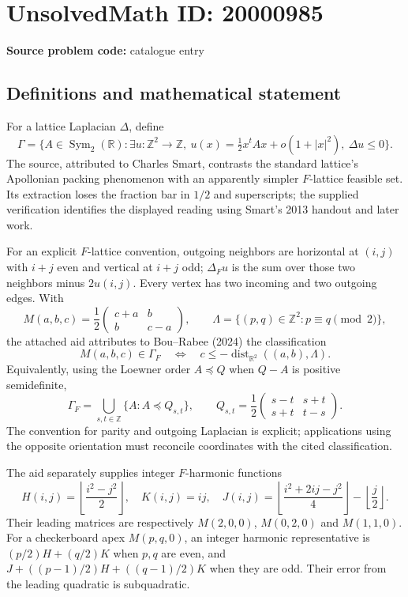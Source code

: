 \documentclass[11pt]{article}
\newcommand{\Z}{\mathbb{Z}}
\newcommand{\R}{\mathbb{R}}
\begin{document}
\section*{UnsolvedMath ID: 20000985}
\textbf{Source problem code:} catalogue entry
\subsection{Definitions and mathematical statement}
For a lattice Laplacian $\Delta$, define
\[
\Gamma=\{A\in\operatorname{Sym}_2(\R):\exists u:\Z^2\to\Z,\ u(x)=\tfrac12x^tAx+o(1+|x|^2),\ \Delta u\le0\}.
\]
The source, attributed to Charles Smart, contrasts the standard lattice's Apollonian packing phenomenon with an apparently simpler $F$-lattice feasible set. Its extraction loses the fraction bar in $1/2$ and superscripts; the supplied verification identifies the displayed reading using Smart's 2013 handout and later work.

For an explicit $F$-lattice convention, outgoing neighbors are horizontal at $(i,j)$ with $i+j$ even and vertical at $i+j$ odd; $\Delta_Fu$ is the sum over those two neighbors minus $2u(i,j)$. Every vertex has two incoming and two outgoing edges. With
\[
M(a,b,c)=\frac12\begin{pmatrix}c+a&b\\b&c-a\end{pmatrix},\qquad
\Lambda=\{(p,q)\in\Z^2:p\equiv q\pmod2\},
\]
the attached aid attributes to Bou--Rabee (2024) the classification
\[
M(a,b,c)\in\Gamma_F\quad\Longleftrightarrow\quad
c\le-\operatorname{dist}_{\R^2}((a,b),\Lambda).
\]
Equivalently, using the Loewner order $A\preceq Q$ when $Q-A$ is positive semidefinite,
\[
\Gamma_F=\bigcup_{s,t\in\Z}\{A:A\preceq Q_{s,t}\},\qquad
Q_{s,t}=\frac12\begin{pmatrix}s-t&s+t\\s+t&t-s\end{pmatrix}.
\]
The convention for parity and outgoing Laplacian is explicit; applications using the opposite orientation must reconcile coordinates with the cited classification.

The aid separately supplies integer $F$-harmonic functions
\[
H(i,j)=\left\lfloor\frac{i^2-j^2}2\right\rfloor,\quad K(i,j)=ij,\quad
J(i,j)=\left\lfloor\frac{i^2+2ij-j^2}4\right\rfloor-\left\lfloor\frac j2\right\rfloor.
\]
Their leading matrices are respectively $M(2,0,0)$, $M(0,2,0)$ and $M(1,1,0)$. For a checkerboard apex $M(p,q,0)$, an integer harmonic representative is $(p/2)H+(q/2)K$ when $p,q$ are even, and $J+((p-1)/2)H+((q-1)/2)K$ when they are odd. Their error from the leading quadratic is subquadratic.
\end{document}

